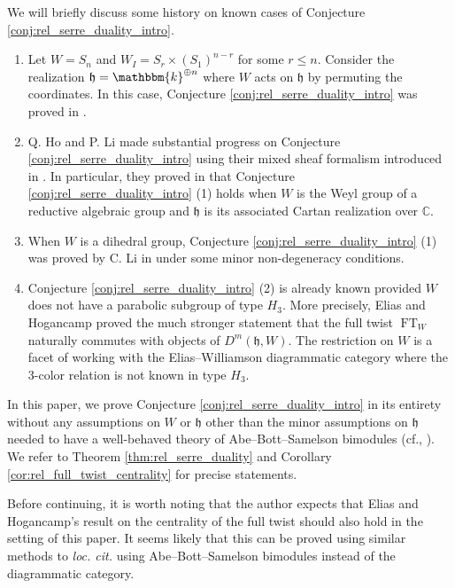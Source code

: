 \documentclass{amsart}
\newcommand{\C}{\mathbb{C}}
\renewcommand{\k}{\mathbbm{k}}
\newcommand{\BE}{D^m}
\newcommand{\fr}[1]{\mathfrak{#1}}
\theoremstyle{definition}
\DeclareMathOperator{\FT}{FT}
\begin{document}
        We will briefly discuss some history on known cases of Conjecture \ref{conj:rel_serre_duality_intro}.
        \begin{enumerate}
                \item Let $W = S_n$ and $W_I = S_r \times (S_1)^{n-r}$ for some $r \leq n$. Consider the realization $\fr{h} = \k^{\oplus n}$ where $W$ acts on $\fr{h}$ by permuting the coordinates. In this case, Conjecture \ref{conj:rel_serre_duality_intro} was proved in \cite{GHMN}.
                \item Q. Ho and P. Li \cite{HLnew} made substantial progress on Conjecture \ref{conj:rel_serre_duality_intro} using their mixed sheaf formalism introduced in \cite{HLgeom}. 
                In particular, they proved in \cite{HLnew} that Conjecture \ref{conj:rel_serre_duality_intro} (1) holds when $W$ is the Weyl group of a reductive algebraic group and $\fr{h}$ is its associated Cartan realization over $\C$.
                \item When $W$ is a dihedral group, Conjecture \ref{conj:rel_serre_duality_intro} (1) was proved by C. Li in \cite{Li} under some minor non-degeneracy conditions.
                \item Conjecture \ref{conj:rel_serre_duality_intro} (2) is already known provided $W$ does not have a parabolic subgroup of type $H_3$.
                More precisely, Elias and Hogancamp \cite{EH} proved the much stronger statement that the full twist $\FT_W$ naturally commutes with objects of $\BE (\fr{h}, W)$. 
                The restriction on $W$ is a facet of working with the Elias--Williamson diagrammatic category where the 3-color relation is not known in type $H_3$.
        \end{enumerate}
        In this paper, we prove Conjecture \ref{conj:rel_serre_duality_intro} in its entirety without any assumptions on $W$ or $\fr{h}$ other than the minor assumptions on $\fr{h}$ needed to have a well-behaved theory of Abe--Bott--Samelson bimodules (cf., \cite{Abe21}).
        We refer to Theorem \ref{thm:rel_serre_duality} and Corollary \ref{cor:rel_full_twist_centrality} for precise statements. 

        Before continuing, it is worth noting that the author expects that Elias and Hogancamp's result on the centrality of the full twist \cite{EH} should also hold in the setting of this paper.
        It seems likely that this can be proved using similar methods to \emph{loc. cit.} using Abe--Bott--Samelson bimodules instead of the diagrammatic category.
\end{document}
